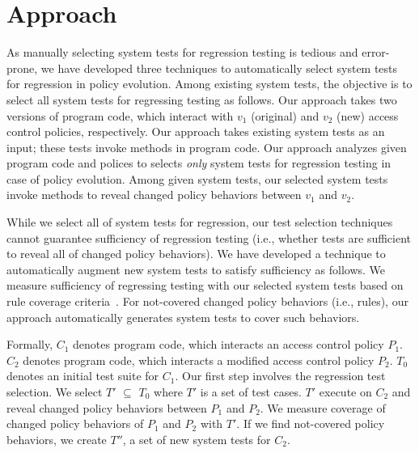 \section{Approach}
\label{sec:approach}


As manually selecting system tests for regression testing is tedious and error-prone, we have developed three techniques to automatically
select system tests for regression in policy evolution. Among existing system tests, the objective is to select
all system tests for regressing testing as follows.
Our approach takes two versions of program code, which interact with $v_1$ (original) and $v_2$ (new) access control policies, respectively. Our approach takes existing system tests as an input; these tests invoke methods in program code.
Our approach analyzes given program code and polices to selects \emph{only} system tests for regression testing in case of policy evolution. Among given system tests, our selected system tests invoke methods to reveal changed policy behaviors between $v_1$ and $v_2$.

While we select all of system tests for regression, our test selection techniques cannot guarantee sufficiency of regression testing (i.e., whether  tests are sufficient to reveal all of changed policy behaviors). We have developed a technique to automatically augment new system
tests to satisfy sufficiency as follows. We measure sufficiency of regressing testing with our selected system tests based on rule coverage criteria~\cite{}. For not-covered changed policy behaviors (i.e., rules), our approach automatically generates system tests to cover such behaviors.

Formally, $C_1$ denotes program code, which interacts an access control policy $P_1$. $C_2$ denotes program code, which interacts a modified access control policy $P_2$. $T_0$ denotes an initial test suite for $C_1$. Our first step involves the regression test selection. We select $T'$ $\subseteq$ $T_0$ where $T'$ is a set of test cases. $T'$ execute on $C_2$ and reveal changed policy behaviors between $P_1$ and $P_2$. We measure coverage of changed policy behaviors of $P_1$ and $P_2$ with $T'$. If we find not-covered policy behaviors, we create $T''$, a set of new system tests for $C_2$. 

